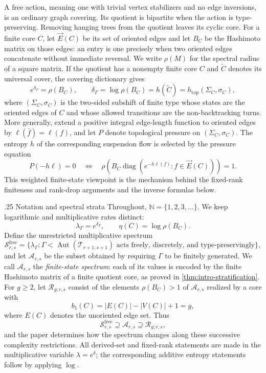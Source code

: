 \documentclass[11pt]{amsart}
\makeatletter
\def\paragraph{\@startsection{paragraph}{4}%
  \z@{.65\linespacing\@plus.45\linespacing}%
  {.25\linespacing}%
  {\normalfont\bfseries}}
\theoremstyle{plain}
\theoremstyle{definition}
\theoremstyle{remark}
\newcommand{\T}{\mathcal T}
\newcommand{\Aut}{\operatorname{Aut}}
\newcommand{\cA}{\mathcal A}
\makeatother
\begin{document}
A free action, meaning one with trivial vertex stabilizers and no edge
inversions, is an ordinary graph covering.  Its quotient is bipartite when
the action is type-preserving.  Removing hanging trees from the quotient
leaves its cyclic core.  For a finite core \(C\), let \(\vec E(C)\) be its
set of oriented edges and let \(B_C\) be the Hashimoto matrix on those
edges: an entry is one precisely when two
oriented edges concatenate without immediate reversal.  We write
\(\rho(M)\) for the spectral radius of a square matrix.  If the quotient has
a nonempty finite core \(C\) and \(\widetilde C\) denotes its universal cover,
the covering dictionary gives
\begin{equation}\label{eq:intro-growth-dictionary}
  e^{\delta_\Gamma}=\rho(B_C),
  \qquad
  \delta_\Gamma=\log\rho(B_C)
  =h(\widetilde C)=h_{\mathrm{top}}(\Sigma_C,\sigma_C),
\end{equation}
where \((\Sigma_C,\sigma_C)\) is the two-sided subshift of finite type whose
states are the oriented edges of \(C\) and whose allowed transitions are the
non-backtracking turns.  More generally, extend a positive integral
edge-length function to oriented edges by \(\ell(\bar f)=\ell(f)\), and let
\(P\) denote topological pressure on \((\Sigma_C,\sigma_C)\).  The entropy
\(h\) of the corresponding suspension flow is selected by the pressure
equation
\begin{equation}\label{eq:intro-pressure-dictionary}
  P(-h\ell)=0
  \quad\Longleftrightarrow\quad
  \rho\!\left(B_C\operatorname{diag}
    (e^{-h\ell(f)}:f\in\vec E(C))\right)=1.
\end{equation}
This weighted finite-state viewpoint is the mechanism behind the fixed-rank
finiteness and rank-drop arguments and the inverse formulas below.

\paragraph{Notation and spectral strata}
Throughout, \(\mathbb N=\{1,2,3,\ldots\}\).  We keep logarithmic and
multiplicative rates distinct:
\[
  \lambda_\Gamma=e^{\delta_\Gamma},
  \qquad
  \eta(C)=\log\rho(B_C).
\]
Define the unrestricted multiplicative spectrum
\[
  \mathcal S_{r,s}^{\mathrm{free}}
  =\{\lambda_\Gamma:\Gamma<\Aut(\T_{r+1,s+1})
       \text{ acts freely, discretely, and type-preservingly}\},
\]
and let \(\cA_{r,s}\) be the subset obtained by requiring \(\Gamma\) to be
finitely generated.  We call \(\cA_{r,s}\) the \emph{finite-state
spectrum}: each of its values is encoded by the finite Hashimoto matrix of a
finite quotient core, as proved in \cref{thm:intro-stratification}.  For
\(g\geq2\), let \(\mathcal R_{g;r,s}\) consist of
the elements \(\rho(B_C)>1\) of \(\cA_{r,s}\) realized by a core with
\[
  b_1(C)=|E(C)|-|V(C)|+1=g,
\]
where \(E(C)\) denotes the unoriented edge set.  Thus
\[
  \mathcal S_{r,s}^{\mathrm{free}}
  \supseteq\cA_{r,s}
  \supseteq\mathcal R_{g;r,s},
\]
and the paper determines how the spectrum changes along these successive
complexity restrictions.  All derived-set and fixed-rank statements are made
in the multiplicative variable \(\lambda=e^\delta\); the corresponding
additive entropy statements follow by applying \(\log\).
\end{document}
